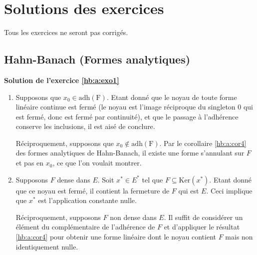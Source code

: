 \chapter{Solutions des exercices}
Tous les exercices ne seront pas corrigés.

\section{Hahn-Banach (Formes analytiques)}
\textbf{Solution de l'exercice \ref{hb:a:exo1}}

\begin{enumerate}
\item Supposons que $x_0\in \mathrm{adh(F)}$.
  Etant donné que le noyau de toute forme linéaire
  continue est fermé (le noyau est l'image réciproque du singleton
  0 qui est fermé, donc est fermé par continuité), et que le passage
  à l'adhérence conserve les inclusions, il est aisé de conclure.

  Réciproquement, supposons que $x_0\notin \mathrm{adh(F)}$.
  Par le corollaire \ref{hb:a:cor4} des formes analytiques de
  Hahn-Banach, il existe une forme s'annulant sur $F$ et pas
  en $x_0$, ce que l'on voulait montrer.
\item Supposons $F$ dense dans $E$. Soit $x^*\in E^*$ tel
  que $F\subseteq\mathrm{Ker}(x^*)$. Etant donné que ce
  noyau est fermé, il contient la fermeture de $F$ qui
  est $E$. Ceci implique que $x^*$ est l'application
  constante nulle.

  Réciproquement, supposons $F$ non dense dans $E$.
  Il suffit de considérer un élément du complémentaire
  de l'adhérence de $F$ et d'appliquer le résultat \ref{hb:a:cor4}
  pour obtenir une forme linéaire dont le noyau contient
  $F$ mais non identiquement nulle.
\end{enumerate}
